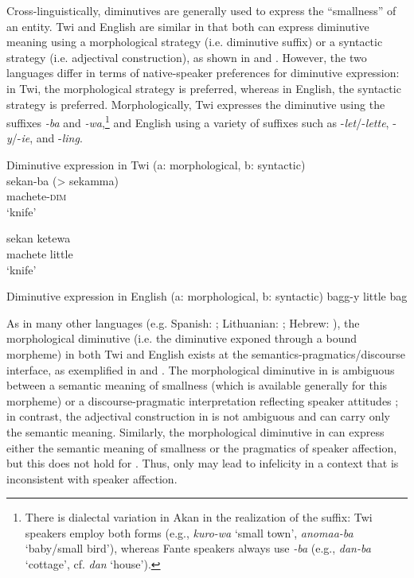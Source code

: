 \documentclass[output=paper,colorlinks,citecolor=brown]{langscibook}
\begin{document}
Cross-linguistically, diminutives are generally used to express the ``smallness'' of an entity. Twi and English are similar in that both can express diminutive meaning using a morphological strategy (i.e. diminutive suffix) or a syntactic strategy (i.e. adjectival construction), as shown in  and . However, the two languages differ in terms of native-speaker preferences for diminutive expression: in Twi, the morphological strategy is preferred, whereas in English, the syntactic strategy is preferred. Morphologically, Twi expresses the diminutive using the suffixes \textit{-ba} and \textit{-wa},\footnote{There is dialectal variation in Akan in the realization of the suffix: Twi speakers employ both forms (e.g., \textit{kuro-wa} `small town', \textit{anomaa-ba} `baby/small bird'), whereas Fante speakers always use \textit{-ba} (e.g., \textit{dan-ba} `cottage', cf. \textit{dan} `house').} and English using a variety of suffixes such as -\textit{let}/-\textit{lette}, -\textit{y}/-\textit{ie}, and -\textit{ling}.\largerpage[-1]

\ea \label{DimTwi}Diminutive expression in Twi (a: morphological, b: syntactic)\\
\ea
\gll \label{ex:sekamma}sekan-ba (> sekamma) \\
machete-\textsc{dim} \\ 
\glt `knife'

\ex
\gll \label{ex:sekan-ketewa}sekan ketewa \\
machete little \\
\glt `knife'
\z

\ex \label{DimEng}Diminutive expression in English (a: morphological, b: syntactic)
\ea \label{ex:baggy}bagg-y
\ex \label{ex:little-bag}little bag
\z
\z

As in many other languages (e.g. Spanish: \citealt{MarreroAguirreAlbala2007}; Lithuanian: \citealt{Savickiene1998}; Hebrew: \citealt{Ravid1998}), the morphological diminutive (i.e. the diminutive exponed through a bound morpheme) in both Twi and English exists at the semantics-pragmatics/discourse interface, as exemplified in  and . The morphological diminutive in  is ambiguous between a semantic meaning of smallness (which is available generally for this morpheme) or a discourse-pragmatic interpretation reflecting speaker attitudes \citep{AppahAmfo2011}; in contrast, the adjectival construction in  is not ambiguous and can carry only the semantic meaning. Similarly, the morphological diminutive in  can express either the semantic meaning of smallness or the pragmatics of speaker affection, but this does not hold for . Thus, only  may lead to infelicity in a context that is inconsistent with speaker affection.
\end{document}
